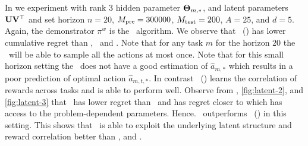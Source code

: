 \documentclass[10pt]{article}
\theoremstyle{plain}
\theoremstyle{definition}
\theoremstyle{remark}
\begin{document}
In  we experiment with rank $3$ hidden parameter $\mathbf{\Theta}_{m,*}$, and latent parameters $\mathbf{U}\mathbf{V}^\top$ and set horizon $n=20$, $M_{\text{pre}} =  300000$, $M_{\text{test}} = 200$, $A=25$, and $d=5$.
Again, the demonstrator $\pi^w$ is the \ts\ algorithm. We observe that \pred\ (\gt) has lower cumulative regret than \dptg, \ad\ and \ts. Note that for any task $m$ for the horizon $20$ the \ts\ will be able to sample all the actions at most once.
Note that for this small horizon setting the \dptg\ does not have a good estimation of $\widehat{a}_{m,*}$ which results in a poor prediction of optimal action $\widehat{a}_{m,t,*}$. In contrast \pred\ (\gt) learns the correlation of rewards across tasks and is able to perform well.
Observe from , \ref{fig:latent-2}, and \ref{fig:latent-3} that \pred\ has lower regret than \ts\ and has regret closer to \estro which has access to the problem-dependent parameters.
Hence. \estro\ outperforms \pred\ (\gt) in this setting.
This shows that \pred\ is able to exploit the underlying latent structure and reward correlation better than \dptg, and \ad.
\end{document}
